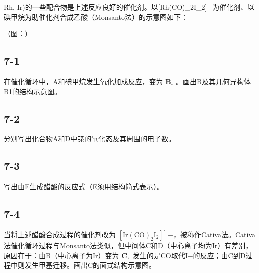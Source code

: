 Rh, Ir)的⼀些配合物是上述反应良好的催化剂。以[Rh(CO)_{2}I_{2}]−为催化剂、以碘甲烷为助催化剂合成⼄酸（Monsanto法）的⽰意图如下：

（图：）

\subsection*{7-1}
在催化循环中，A和碘甲烷发⽣氧化加成反应，变为 $\mathbf { B } _ { \circ }$ 。画出B及其⼏何异构体B1的结构⽰意图。

\subsection*{7-2}
分别写出化合物A和D中铑的氧化态及其周围的电⼦数。

\subsection*{7-3}
写出由E⽣成醋酸的反应式（E须⽤结构简式表⽰）。

\subsection*{7-4}
当将上述醋酸合成过程的催化剂改为 $[ \mathrm { I r } ( \mathrm { C O } ) _ { 2 } \mathrm { I } _ { 2 } ] ^ { \cdot }$ −，被称作Cativa法。Cativa法催化循环过程与Monsanto法类似，但中间体C和D（中⼼离⼦均为Ir）有差别，原因在于：由B（中⼼离⼦为Ir）变为 $\mathbf { C } ,$ 发⽣的是CO取代I−的反应；由C到D过程中则发⽣甲基迁移。画出C的⾯式结构⽰意图。
